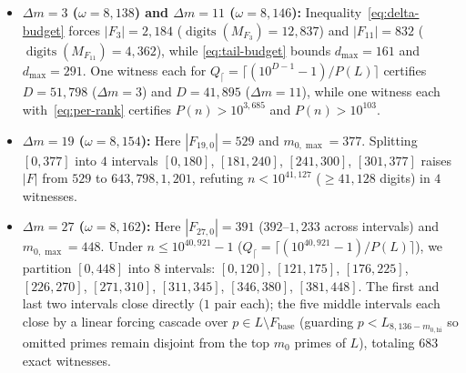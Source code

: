 \documentclass[11pt]{article}
\theoremstyle{remark}
\begin{document}
\begin{itemize}
  \item \textbf{$\Delta m = 3$ ($\omega = 8{,}138$) and $\Delta m = 11$
  ($\omega = 8{,}146$):} Inequality~\eqref{eq:delta-budget} forces
  $|F_3| = 2{,}184$ ($\operatorname{digits}(M_{F_3}) = 12{,}837$) and
  $|F_{11}| = 832$ ($\operatorname{digits}(M_{F_{11}}) = 4{,}362$), while
  \eqref{eq:tail-budget} bounds $d_{\max} = 161$ and $d_{\max} = 291$. One
  witness each for $Q_{\lceil} = \lceil(10^{D-1}-1)/P(L)\rceil$ certifies
  $D = 51{,}798$ ($\Delta m = 3$) and $D = 41{,}895$ ($\Delta m = 11$), while
  one witness each with~\eqref{eq:per-rank} certifies $P(n) > 10^{3{,}685}$ and
  $P(n) > 10^{103}$.

  \item \textbf{$\Delta m = 19$ ($\omega = 8{,}154$):} Here $|F_{19,0}| = 529$
  and $m_{0,\max} = 377$. Splitting $[0, 377]$ into $4$ intervals
  $[0,180]$, $[181,240]$, $[241,300]$, $[301,377]$ raises $|F|$ from $529$ to
  $643, 798, 1{,}201$, refuting $n < 10^{41{,}127}$ ($\ge 41{,}128$ digits) in
  $4$ witnesses.

  \item \textbf{$\Delta m = 27$ ($\omega = 8{,}162$):} Here $|F_{27,0}| = 391$
  ($392$--$1{,}233$ across intervals) and $m_{0,\max} = 448$. Under $n \le 10^{40{,}921} - 1$
  ($Q_{\lceil} = \lceil(10^{40{,}921}-1)/P(L)\rceil$), we partition $[0,448]$
  into $8$ intervals: $[0,120]$, $[121,175]$, $[176,225]$, $[226,270]$,
  $[271,310]$, $[311,345]$, $[346,380]$, $[381,448]$. The first and last two
  intervals close directly ($1$ pair each); the five middle intervals each close
  by a linear forcing cascade over $p \in L \setminus F_{\mathrm{base}}$
  (guarding $p < L_{8{,}136 - m_{0,\mathrm{hi}}}$ so omitted primes remain
  disjoint from the top $m_0$ primes of $L$), totaling $683$ exact witnesses.


\end{itemize}
\end{document}

